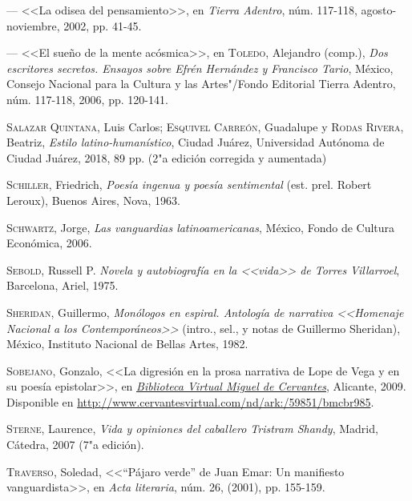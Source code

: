 \documentclass[14pt,twoside,final]{extbook} %
\begin{document}
--- <<La odisea del pensamiento>>, en \emph{Tierra Adentro}, núm. 117-118, \newline agosto-noviembre, 2002, pp. 41-45.\label{bib:rosas2002b}

--- <<El sueño de la mente acósmica>>, en \textsc{Toledo}, Alejandro (comp.), \emph{Dos escritores secretos. Ensayos sobre Efrén Hernández y Francisco Tario}, México, Consejo Nacional para la Cultura y las Artes"/Fondo Editorial Tierra Adentro, núm. 117-118, 2006, pp. 120-141.\label{bib:rosas2006}

\textsc{Salazar Quintana}, Luis Carlos; \textsc{Esquivel Carreón}, Guadalupe y \textsc{Rodas Rivera}, Beatriz, \emph{Estilo latino-humanístico}, Ciudad Juárez, Universidad Autónoma de Ciudad Juárez, 2018, 89 pp. (2"a edición corregida y aumentada)

\textsc{Schiller}, Friedrich, \emph{Poesía ingenua y poesía sentimental} (est. prel. Robert Leroux), Buenos Aires, Nova, 1963.\label{bib:schiller1963}

\textsc{Schwartz}, Jorge, \emph{Las vanguardias latinoamericanas}, México, Fondo de Cultura Económica, 2006.\label{bib:schwartz2006}

\textsc{Sebold}, Russell P. \emph{Novela y autobiografía en la <<vida>> de Torres Villarroel}, Barcelona, Ariel, 1975.\label{bib:sebold1975}

\textsc{Sheridan}, Guillermo, \emph{Monólogos en espiral. Antología de narrativa <<Homenaje Nacional a los \emph{Contemporáneos}>>} (intro., sel., y notas de Guillermo Sheridan), México, Instituto Nacional de Bellas Artes, 1982.\label{bib:sheridan1982}

\textsc{Sobejano}, Gonzalo, <<La digresión en la prosa narrativa de Lope de Vega y en su poesía epistolar>>, en \href{http://www.cervantesvirtual.com/}{\emph{Biblioteca Virtual Miguel de Cervantes}}, Alicante, 2009. Disponible en \guilsinglleft \url{http://www.cervantesvirtual.com/nd/ark:/59851/bmcbr985}\guilsinglright.

\textsc{Sterne}, Laurence, \emph{Vida y opiniones del caballero Tristram Shandy}, Madrid, Cátedra, 2007 (7"a edición).\label{bib:sterne2007}

\textsc{Traverso}, Soledad, <<``Pájaro verde'' de Juan Emar: Un manifiesto vanguardista>>, en \emph{Acta literaria}, núm. 26, (2001), pp. 155-159.\label{bib:traverzo2001}
\end{document}

